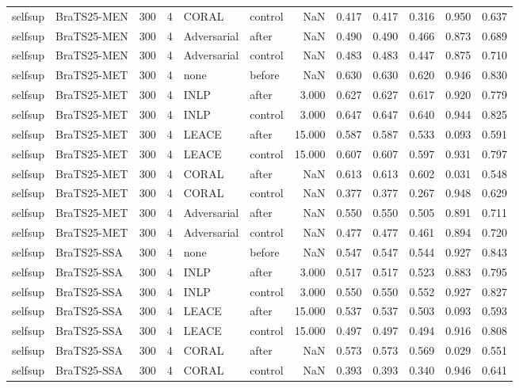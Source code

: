 \begin{tabular}{llrrllrrrrrr}
selfsup & BraTS25-MEN & 300 & 4 & CORAL & control & NaN & 0.417 & 0.417 & 0.316 & 0.950 & 0.637 \\
selfsup & BraTS25-MEN & 300 & 4 & Adversarial & after & NaN & 0.490 & 0.490 & 0.466 & 0.873 & 0.689 \\
selfsup & BraTS25-MEN & 300 & 4 & Adversarial & control & NaN & 0.483 & 0.483 & 0.447 & 0.875 & 0.710 \\
selfsup & BraTS25-MET & 300 & 4 & none & before & NaN & 0.630 & 0.630 & 0.620 & 0.946 & 0.830 \\
selfsup & BraTS25-MET & 300 & 4 & INLP & after & 3.000 & 0.627 & 0.627 & 0.617 & 0.920 & 0.779 \\
selfsup & BraTS25-MET & 300 & 4 & INLP & control & 3.000 & 0.647 & 0.647 & 0.640 & 0.944 & 0.825 \\
selfsup & BraTS25-MET & 300 & 4 & LEACE & after & 15.000 & 0.587 & 0.587 & 0.533 & 0.093 & 0.591 \\
selfsup & BraTS25-MET & 300 & 4 & LEACE & control & 15.000 & 0.607 & 0.607 & 0.597 & 0.931 & 0.797 \\
selfsup & BraTS25-MET & 300 & 4 & CORAL & after & NaN & 0.613 & 0.613 & 0.602 & 0.031 & 0.548 \\
selfsup & BraTS25-MET & 300 & 4 & CORAL & control & NaN & 0.377 & 0.377 & 0.267 & 0.948 & 0.629 \\
selfsup & BraTS25-MET & 300 & 4 & Adversarial & after & NaN & 0.550 & 0.550 & 0.505 & 0.891 & 0.711 \\
selfsup & BraTS25-MET & 300 & 4 & Adversarial & control & NaN & 0.477 & 0.477 & 0.461 & 0.894 & 0.720 \\
selfsup & BraTS25-SSA & 300 & 4 & none & before & NaN & 0.547 & 0.547 & 0.544 & 0.927 & 0.843 \\
selfsup & BraTS25-SSA & 300 & 4 & INLP & after & 3.000 & 0.517 & 0.517 & 0.523 & 0.883 & 0.795 \\
selfsup & BraTS25-SSA & 300 & 4 & INLP & control & 3.000 & 0.550 & 0.550 & 0.552 & 0.927 & 0.827 \\
selfsup & BraTS25-SSA & 300 & 4 & LEACE & after & 15.000 & 0.537 & 0.537 & 0.503 & 0.093 & 0.593 \\
selfsup & BraTS25-SSA & 300 & 4 & LEACE & control & 15.000 & 0.497 & 0.497 & 0.494 & 0.916 & 0.808 \\
selfsup & BraTS25-SSA & 300 & 4 & CORAL & after & NaN & 0.573 & 0.573 & 0.569 & 0.029 & 0.551 \\
selfsup & BraTS25-SSA & 300 & 4 & CORAL & control & NaN & 0.393 & 0.393 & 0.340 & 0.946 & 0.641 \\

\end{tabular}
